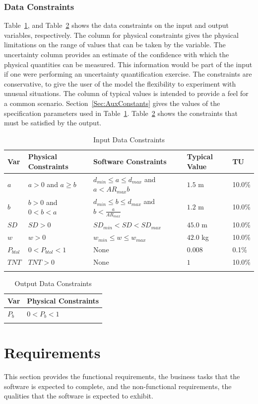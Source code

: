 \documentclass[12pt]{article}
\begin{document}
\subsubsection{Data Constraints}
\label{Sec:DataConstraints}
Table~\ref{Table:InDataConstraints}, and Table~\ref{Table:OutDataConstraints} shows the data constraints on the input and output variables, respectively. The column for physical constraints gives the physical limitations on the range of values that can be taken by the variable. The uncertainty column provides an estimate of the confidence with which the physical quantities can be measured. This information would be part of the input if one were performing an uncertainty quantification exercise. The constraints are conservative, to give the user of the model the flexibility to experiment with unusual situations. The column of typical values is intended to provide a feel for a common scenario. Section~\ref{Sec:AuxConstants} gives the values of the specification parameters used in Table~\ref{Table:InDataConstraints}. Table~\ref{Table:OutDataConstraints} shows the constraints that must be satisfied by the output.
\begin{longtable}{l l l l l}
\toprule
Var & Physical Constraints & Software Constraints & Typical Value & TU
\\
\midrule
$a$ & $a>0$ and $a\geq{}b$ & ${d_{min}}\leq{}a\leq{}{d_{max}}$ and $a<{AR_{max}} b$ & $1.5$ m & 10.0\%
\\
$b$ & $b>0$ and $0<b<a$ & ${d_{min}}\leq{}b\leq{}{d_{max}}$ and $b<\frac{a}{{AR_{max}}}$ & $1.2$ m & 10.0\%
\\
$SD$ & $SD>0$ & ${SD_{min}}<SD<{SD_{max}}$ & $45.0$ m & 10.0\%
\\
$w$ & $w>0$ & ${w_{min}}\leq{}w\leq{}{w_{max}}$ & $42.0$ kg & 10.0\%
\\
${P_{btol}}$ & $0<{P_{btol}}<1$ & None & $0.008$ & 0.1\%
\\
$TNT$ & $TNT>0$ & None & $1$ & 10.0\%
\\
\bottomrule
\caption{Input Data Constraints}
\label{Table:InDataConstraints}
\end{longtable}
\begin{longtable}{l l}
\toprule
Var & Physical Constraints
\\
\midrule
${P_{b}}$ & $0<{P_{b}}<1$
\\
\bottomrule
\caption{Output Data Constraints}
\label{Table:OutDataConstraints}
\end{longtable}
\section{Requirements}
\label{Sec:Requirements}
This section provides the functional requirements, the business tasks that the software is expected to complete, and the non-functional requirements, the qualities that the software is expected to exhibit.
\end{document}
